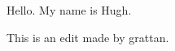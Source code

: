 \documentclass{grattanAlpha}
\begin{document}
Hello. My name is Hugh.

This is an edit made by grattan.
\end{document}
